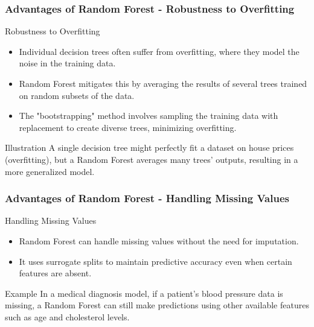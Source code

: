 \documentclass[aspectratio=169]{beamer}
\begin{document}
\begin{frame}[fragile]
    \frametitle{Advantages of Random Forest - Robustness to Overfitting}
    \begin{block}{Robustness to Overfitting}
        \begin{itemize}
            \item Individual decision trees often suffer from overfitting, where they model the noise in the training data.
            \item Random Forest mitigates this by averaging the results of several trees trained on random subsets of the data.
            \item The "bootstrapping" method involves sampling the training data with replacement to create diverse trees, minimizing overfitting.
        \end{itemize}
    \end{block}
    \begin{block}{Illustration}
        A single decision tree might perfectly fit a dataset on house prices (overfitting), but a Random Forest averages many trees' outputs, resulting in a more generalized model.
    \end{block}
\end{frame}

\begin{frame}[fragile]
    \frametitle{Advantages of Random Forest - Handling Missing Values}
    \begin{block}{Handling Missing Values}
        \begin{itemize}
            \item Random Forest can handle missing values without the need for imputation.
            \item It uses surrogate splits to maintain predictive accuracy even when certain features are absent.
        \end{itemize}
    \end{block}
    \begin{block}{Example}
        In a medical diagnosis model, if a patient's blood pressure data is missing, a Random Forest can still make predictions using other available features such as age and cholesterol levels.
    \end{block}
\end{frame}
\end{document}
